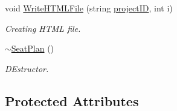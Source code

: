 \begin{DoxyCompactItemize}
\item 
void \hyperlink{classSeatPlan_a67c10e2277f1f2823581cddf4df373c5}{\-Write\-H\-T\-M\-L\-File} (string \hyperlink{classReadInput_a3ad470a25b3e0a29466bf4ff1f7d8e81}{project\-I\-D}, int i)
\begin{DoxyCompactList}\small\item\em \-Creating \-H\-T\-M\-L file. \end{DoxyCompactList}\item 
\hyperlink{classSeatPlan_a373a1d60b6617a2e424f7d2f8866ec2e}{$\sim$\-Seat\-Plan} ()
\begin{DoxyCompactList}\small\item\em \-D\-Estructor. \end{DoxyCompactList}\end{DoxyCompactItemize}
\subsection*{\-Protected \-Attributes}
